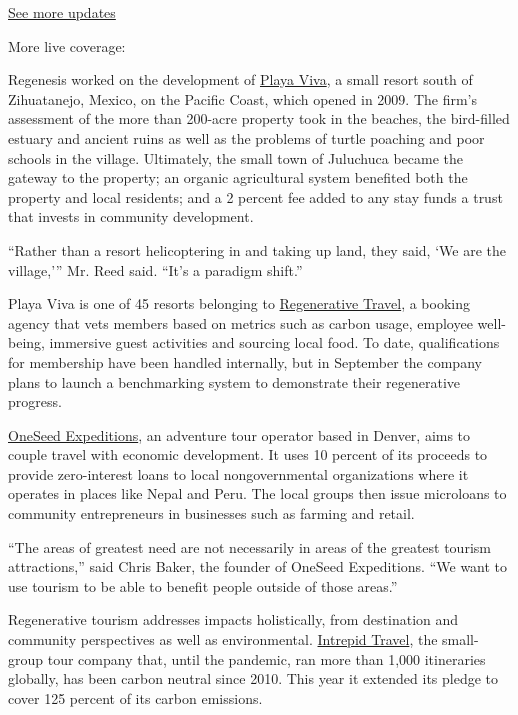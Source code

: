 \href{https://www.nytimes3xbfgragh.onion/2020/09/08/world/covid-19-coronavirus.html?action=click\&pgtype=Article\&state=default\&region=MAIN_CONTENT_1\&context=storylines_live_updates}{See
more updates}

More live coverage:

Regenesis worked on the development of
\href{https://www.playaviva.com/}{Playa Viva}, a small resort south of
Zihuatanejo, Mexico, on the Pacific Coast, which opened in 2009. The
firm's assessment of the more than 200-acre property took in the
beaches, the bird-filled estuary and ancient ruins as well as the
problems of turtle poaching and poor schools in the village. Ultimately,
the small town of Juluchuca became the gateway to the property; an
organic agricultural system benefited both the property and local
residents; and a 2 percent fee added to any stay funds a trust that
invests in community development.

``Rather than a resort helicoptering in and taking up land, they said,
`We are the village,''' Mr. Reed said. ``It's a paradigm shift.''

Playa Viva is one of 45 resorts belonging to
\href{https://www.regenerativetravel.com/about/}{Regenerative Travel}, a
booking agency that vets members based on metrics such as carbon usage,
employee well-being, immersive guest activities and sourcing local food.
To date, qualifications for membership have been handled internally, but
in September the company plans to launch a benchmarking system to
demonstrate their regenerative progress.

\href{https://www.oneseedexpeditions.com/}{OneSeed Expeditions}, an
adventure tour operator based in Denver, aims to couple travel with
economic development. It uses 10 percent of its proceeds to provide
zero-interest loans to local nongovernmental organizations where it
operates in places like Nepal and Peru. The local groups then issue
microloans to community entrepreneurs in businesses such as farming and
retail.

``The areas of greatest need are not necessarily in areas of the
greatest tourism attractions,'' said Chris Baker, the founder of OneSeed
Expeditions. ``We want to use tourism to be able to benefit people
outside of those areas.''

Regenerative tourism addresses impacts holistically, from destination
and community perspectives as well as environmental.
\href{https://www.intrepidtravel.com/us}{Intrepid Travel}, the
small-group tour company that, until the pandemic, ran more than 1,000
itineraries globally, has been carbon neutral since 2010. This year it
extended its pledge to cover 125 percent of its carbon emissions.

